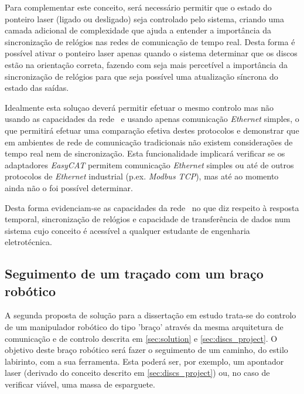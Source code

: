 Para complementar este conceito, será necessário permitir que o estado
do ponteiro laser (ligado ou desligado) seja controlado pelo sistema,
criando uma camada adicional de complexidade que ajuda a entender a
importância da sincronização de relógios nas redes de comunicação de
tempo real. Desta forma é possível ativar o ponteiro laser apenas quando
o sistema  determinar que os discos estão na orientação correta, fazendo
com seja mais percetível a importância da sincronização de relógios para
que seja possível uma atualização síncrona do estado das saídas.

Idealmente esta soluçao deverá permitir efetuar o mesmo controlo mas não
usando as capacidades da rede \ecat\ e usando apenas comunicação
\emph{Ethernet} simples, o que permitirá efetuar uma comparação efetiva
destes protocolos e demonstrar que em ambientes de rede de comunicação
tradicionais não existem considerações de tempo real nem de sincronização.
Esta funcionalidade implicará verificar se os adaptadores \emph{EasyCAT}
permitem comunicação \emph{Ethernet} simples ou até de outros protocolos
de \emph{Ethernet} industrial (p.ex. \emph{Modbus TCP}), mas até ao momento
ainda não o foi possível determinar.

Desta forma evidenciam-se as capacidades da rede \ecat\ no que diz
respeito à resposta temporal, sincronização de relógios e capacidade de
transferência de dados num sistema cujo conceito é acessível a qualquer
estudante de engenharia eletrotécnica.


\subsection{Seguimento de um traçado com um braço robótico}\label{sec:robotic_arm}

A segunda proposta de solução para a dissertação em estudo trata-se do
controlo de um manipulador robótico do tipo 'braço' através da mesma
arquitetura de comunicação e de controlo descrita em \ref{sec:solution} e
\ref{sec:discs_project}. O objetivo deste braço robótico será fazer o
seguimento de um caminho, do estilo labirinto, com a sua ferramenta.
Esta poderá ser, por exemplo, um apontador laser (derivado do conceito
descrito em \ref{sec:discs_project}) ou, no caso de verificar viável, uma
massa de esparguete.

